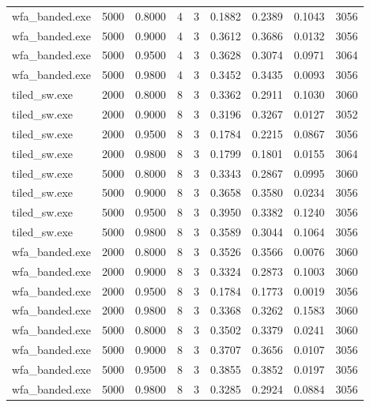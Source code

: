 \begin{tabular}{lrrrrrrrr}
wfa_banded.exe & 5000 & 0.8000 & 4 & 3 & 0.1882 & 0.2389 & 0.1043 & 3056 \\
wfa_banded.exe & 5000 & 0.9000 & 4 & 3 & 0.3612 & 0.3686 & 0.0132 & 3056 \\
wfa_banded.exe & 5000 & 0.9500 & 4 & 3 & 0.3628 & 0.3074 & 0.0971 & 3064 \\
wfa_banded.exe & 5000 & 0.9800 & 4 & 3 & 0.3452 & 0.3435 & 0.0093 & 3056 \\
tiled_sw.exe & 2000 & 0.8000 & 8 & 3 & 0.3362 & 0.2911 & 0.1030 & 3060 \\
tiled_sw.exe & 2000 & 0.9000 & 8 & 3 & 0.3196 & 0.3267 & 0.0127 & 3052 \\
tiled_sw.exe & 2000 & 0.9500 & 8 & 3 & 0.1784 & 0.2215 & 0.0867 & 3056 \\
tiled_sw.exe & 2000 & 0.9800 & 8 & 3 & 0.1799 & 0.1801 & 0.0155 & 3064 \\
tiled_sw.exe & 5000 & 0.8000 & 8 & 3 & 0.3343 & 0.2867 & 0.0995 & 3060 \\
tiled_sw.exe & 5000 & 0.9000 & 8 & 3 & 0.3658 & 0.3580 & 0.0234 & 3056 \\
tiled_sw.exe & 5000 & 0.9500 & 8 & 3 & 0.3950 & 0.3382 & 0.1240 & 3056 \\
tiled_sw.exe & 5000 & 0.9800 & 8 & 3 & 0.3589 & 0.3044 & 0.1064 & 3056 \\
wfa_banded.exe & 2000 & 0.8000 & 8 & 3 & 0.3526 & 0.3566 & 0.0076 & 3060 \\
wfa_banded.exe & 2000 & 0.9000 & 8 & 3 & 0.3324 & 0.2873 & 0.1003 & 3060 \\
wfa_banded.exe & 2000 & 0.9500 & 8 & 3 & 0.1784 & 0.1773 & 0.0019 & 3056 \\
wfa_banded.exe & 2000 & 0.9800 & 8 & 3 & 0.3368 & 0.3262 & 0.1583 & 3060 \\
wfa_banded.exe & 5000 & 0.8000 & 8 & 3 & 0.3502 & 0.3379 & 0.0241 & 3060 \\
wfa_banded.exe & 5000 & 0.9000 & 8 & 3 & 0.3707 & 0.3656 & 0.0107 & 3056 \\
wfa_banded.exe & 5000 & 0.9500 & 8 & 3 & 0.3855 & 0.3852 & 0.0197 & 3056 \\
wfa_banded.exe & 5000 & 0.9800 & 8 & 3 & 0.3285 & 0.2924 & 0.0884 & 3056 \\
\bottomrule
\end{tabular}

